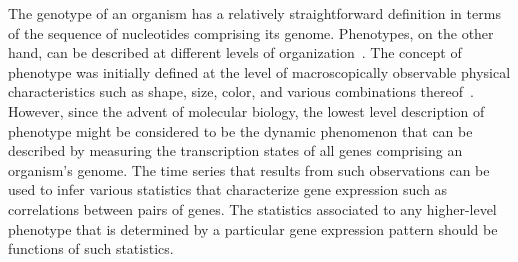 

The genotype of an organism has a relatively straightforward definition in terms of the sequence of nucleotides comprising its genome. Phenotypes, on the other hand, can be described at different levels of organization~\cite{Dawkins1982,Stadler2001}. The concept of phenotype was initially defined at the level of macroscopically observable physical characteristics such as shape, size, color, and various combinations thereof~\cite{Johannsen1911}. However, since the advent of molecular biology, the lowest level description of phenotype might be considered to be the dynamic phenomenon that can be described by measuring the transcription states of all genes comprising an organism's genome. The time series that results from such observations can be used to infer various statistics that characterize gene expression such as correlations between pairs of genes. The statistics associated to any higher-level phenotype that is determined by a particular gene expression pattern should be functions of such statistics.

